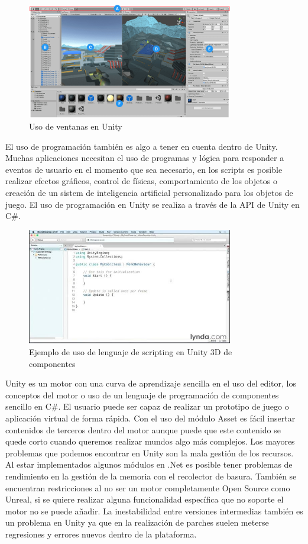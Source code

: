 \documentclass[a4paper]{book}
\begin{document}
\begin{figure}[H]
    \centering
    \includegraphics[width=9cm, keepaspectratio]{img/editor_unity.png}
    \caption{Uso de ventanas en Unity}
    \label{editor_unity}
\end{figure}

El uso de programación también es algo a tener en cuenta dentro de Unity. Muchas aplicaciones necesitan el uso
de programas y lógica para responder a eventos de usuario en el momento que sea necesario, en los scripts es posible
realizar efectos gráficos, control de físicas, comportamiento de los objetos o creación de un sistem de inteligencia
artificial personalizado para los objetos de juego. El uso de programación en Unity se realiza a través de la
API de Unity en C\#.

\begin{figure}[H]
    \centering
    \includegraphics[width=9cm, keepaspectratio]{img/APIUnity.jpg}
    \caption{Ejemplo de uso de lenguaje de scripting en Unity 3D de componentes}
    \label{APIUnity}
\end{figure}

Unity es un motor con una curva de aprendizaje sencilla en el uso del editor, los conceptos del motor o uso de un
lenguaje de programación de componentes sencillo en C\#. El usuario puede ser capaz de realizar un prototipo de
juego o aplicación virtual de forma rápida. Con el uso del módulo Asset es fácil insertar contenidos de terceros
dentro del motor aunque puede que este contenido se quede corto cuando queremos realizar mundos algo más complejos. Los mayores
problemas que podemos encontrar en Unity son la mala gestión de los recursos. Al estar implementados
algunos módulos en .Net es posible tener problemas de rendimiento en la gestión de la memoria con el recolector de basura. También se
encuentran restricciones al no ser un motor completamente Open Source como Unreal, si se quiere realizar
alguna funcionalidad específica que no soporte el motor no se puede añadir. La inestabilidad entre versiones intermedias
también es un problema en Unity ya que en la realización de parches suelen meterse regresiones y errores nuevos dentro de la plataforma. \cite{unity:_manual}
\end{document}
